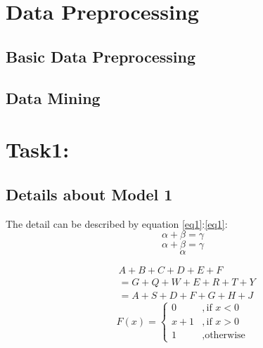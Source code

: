 \documentclass[12pt]{article}  %
\begin{document}
\section{Data Preprocessing}
\subsection{Basic Data Preprocessing}
\subsection{Data Mining}
\section{Task1:}
\subsection{Details about Model 1}
The detail can be described by equation \eqref{eq1}:\autoref{eq1}:
\begin{equation}\label{eq1}
\alpha+\beta=\gamma
\end{equation}
\[
\alpha+\beta=\gamma
\]
$$\alpha$$


\begin{equation}\label{eq2}
	\begin{split}
	&A+B+C+D+E+F\\
	&=G+Q+W+E+R+T+Y\\
	&=A+S+D+F+G+H+J
	\end{split}
\end{equation}
\begin{equation}\label{eq3}
	F(x)=
	\begin{cases}
		0&,\text{if $x<0$}\\
		x+1&,\text{if $x>0$}\\
		1&,\text{otherwise}
			\end{cases}
\end{equation}
\end{document}
